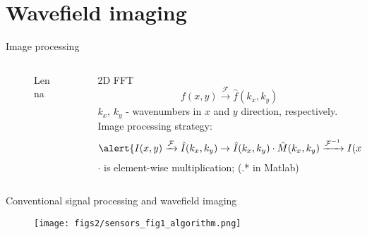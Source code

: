 \documentclass[10pt,aspectratio=169,dvipsnames]{beamer} %
\begin{document}
\section{Wavefield imaging}
\begin{frame}{Image processing}
	\begin{columns}[T]
		\begin{column}{0.4\textwidth}
			\begin{figure}
				\caption{Lenna}
			\end{figure}
		\end{column}
		\begin{column}{0.6\textwidth}
			2D FFT
			\begin{equation*}
				f(x,y) \xrightarrow{\mathcal{F}} \hat{f}(k_x,k_y)
			\end{equation*}
			\(k_x,\, k_y\) - wavenumbers in \(x\) and \(y\) direction, respectively.\\
			Image processing strategy:
			\begin{equation*}
				\alert{I(x,y) \xrightarrow{\mathcal{F}} \hat{I}(k_x,k_y) \rightarrow \hat{I}(k_x,k_y) \cdot \hat{M}(k_x,k_y)  \xrightarrow{\mathcal{F}^{-1}}  I(x,y)}
			\end{equation*}
			\(\cdot\) is element-wise multiplication; (.* in Matlab)
		\end{column}
	\end{columns}
\end{frame}
\begin{frame}[t]{Conventional signal processing and wavefield imaging}
	\begin{figure}
		\texttt{[image: figs2/sensors\_fig1\_algorithm.png]}
	\end{figure}
\end{frame}
\end{document}
